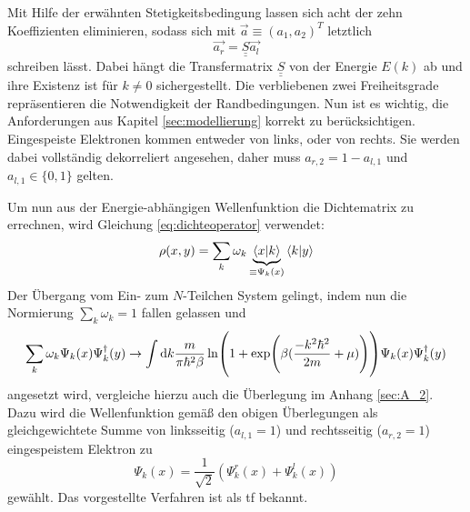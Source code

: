 Mit Hilfe der erwähnten Stetigkeitsbedingung lassen sich acht der zehn Koeffizienten eliminieren, sodass sich mit $\vec{a}\equiv(a_1, a_2)^T$ letztlich
\begin{equation}
  \vec{a_r} = \underline{\underline{S}} \vec{a_l}
\end{equation}
schreiben lässt. Dabei hängt die Transfermatrix $\underline{\underline{S}}$ von der Energie $E(k)$ ab und ihre Existenz ist für $k\neq 0$ sichergestellt.
 Die verbliebenen zwei Freiheitsgrade repräsentieren die Notwendigkeit der Randbedingungen. Nun ist es wichtig, die Anforderungen aus Kapitel \ref{sec:modellierung} korrekt zu berücksichtigen. Eingespeiste Elektronen kommen entweder von links, oder von rechts. Sie werden dabei vollständig dekorreliert angesehen, daher muss ${a_{r,2}=1-a_{l,1}}$ und ${a_{l,1}\in\{0,1\}}$ gelten.

Um nun aus der Energie-abhängigen Wellenfunktion die Dichtematrix zu errechnen, wird Gleichung \eqref{eq:dichteoperator} verwendet:
\begin{equation}
  \rho(x,y) = \sum_k \omega_k \underbrace{\bra{x}\ket{k}}_{\equiv\Psi_k(x)}\bra{k}\ket{y}
\end{equation}
Der Übergang vom Ein- zum $N$-Teilchen System gelingt, indem nun die Normierung $\sum_k \omega_k = 1$ fallen gelassen und
\begin{equation}
  \sum_k \omega_k  \Psi_k(x) \Psi_k^{\dagger}(y) \rightarrow \int \mathop{}\!\mathrm{d} k \frac{m}{\pi\hbar^2\beta} \ln(1+\exp(\beta(\frac{- k^2\hbar^2}{2m} + \mu))) \Psi_k(x) \Psi_k^{\dagger}(y)
\end{equation}
angesetzt wird, vergleiche hierzu auch die Überlegung im Anhang \ref{sec:A_2}. Dazu wird die Wellenfunktion gemäß den obigen Überlegungen als gleichgewichtete Summe von linksseitig (${a_{l,1}=1}$) und rechtsseitig (${a_{r,2}=1}$) eingespeistem Elektron zu
\begin{equation}
  \Psi_k(x) = \frac{1}{\sqrt{2}}(\Psi_k^r(x) + \Psi_k^l(x))
\end{equation}
gewählt. Das vorgestellte Verfahren ist als \ac{tf} bekannt.



